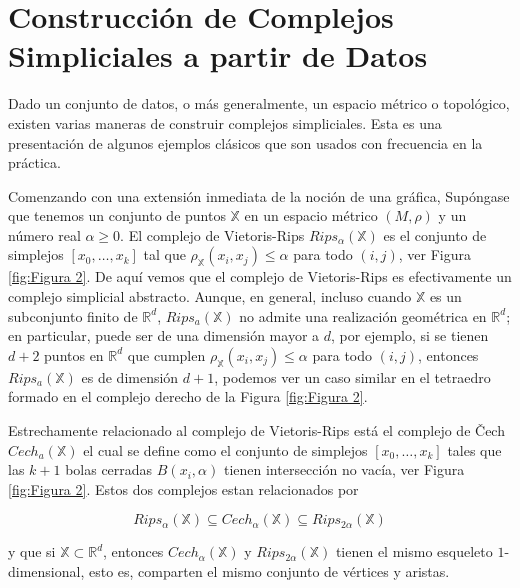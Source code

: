 \section*{Construcci\'on de Complejos Simpliciales a partir de Datos}

Dado un conjunto de datos, o m\'as generalmente, un espacio m\'etrico o topol\'ogico, existen varias
maneras de construir complejos simpliciales. Esta es una presentaci\'on de algunos ejemplos cl\'asicos
que son usados con frecuencia en la pr\'actica.

Comenzando con una extensi\'on inmediata de la noci\'on de una gr\'afica, Sup\'ongase que
tenemos un conjunto de puntos $\mathbb{X}$ en un espacio m\'etrico $\left(M, \rho\right)$ y un n\'umero
real $\alpha \geq 0$. El complejo de Vietoris-Rips $Rips_{\alpha}\left(\mathbb{X}\right)$ es el conjunto
de simplejos $\left[x_{0}, \dots, x_{k}\right]$ tal que
$\rho_{\mathbb{X}}\left(x_{i}, x_{j}\right)\leq\alpha$ para todo
$\left(i, j\right)$, ver Figura \ref{fig:Figura 2}. De aqu\'i vemos que el complejo de
Vietoris-Rips es efectivamente
un complejo simplicial abstracto. Aunque, en general, incluso cuando $\mathbb{X}$ es un subconjunto
finito de $\mathbb{R}^{d}$, $Rips_{a}\left(\mathbb{X}\right)$ no admite una realizaci\'on geom\'etrica en
$\mathbb{R}^{d}$; en particular, puede ser de una dimensi\'on mayor a $d$, por ejemplo, si se tienen $d+2$
puntos en $\mathbb{R}^{d}$ que cumplen $\rho_{\mathbb{X}}\left(x_{i},x_{j}\right)\leq\alpha$ para todo
$\left(i,j\right)$, entonces $Rips_{a}\left(\mathbb{X}\right)$ es de dimensi\'on $d+1$, podemos ver un
caso similar en el tetraedro formado en el complejo derecho de la Figura \ref{fig:Figura 2}.

Estrechamente relacionado al complejo de Vietoris-Rips est\'a el complejo de
\v Cech $Cech_{a}\left(\mathbb{X}\right)$ el cual se define como el conjunto de simplejos
$\left[x_{0}, \dots, x_{k}\right]$ tales que las $k + 1$ bolas cerradas $B\left(x_{i},\alpha\right)$
tienen intersecci\'on no vac\'ia, ver Figura \ref{fig:Figura 2}. Estos dos complejos estan relacionados por

\begin{equation*}
    Rips_{\alpha}\left(\mathbb{X}\right)\subseteq
    Cech_{\alpha}\left(\mathbb{X}\right)\subseteq
    Rips_{2\alpha}\left(\mathbb{X}\right)
\end{equation*}

\noindent y que si $\mathbb{X}\subset\mathbb{R}^{d}$, entonces $Cech_{\alpha}\left(\mathbb{X}\right)$ y
$Rips_{2\alpha}\left(\mathbb{X}\right)$ tienen el mismo esqueleto $1$-dimensional, esto es, comparten el
mismo conjunto de v\'ertices y aristas.

